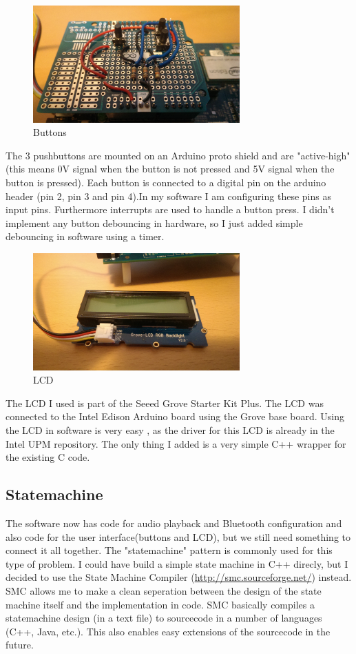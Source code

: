\documentclass[12pt,a4paper]{scrreprt}
\begin{document}
\begin{figure}[h]
	\includegraphics[width=300px]{images/buttons1}
	\caption{Buttons}
\end{figure}

The 3 pushbuttons are mounted on an Arduino proto shield and are "active-high" (this means 0V signal when the button is not pressed and 5V signal when the button is pressed).
Each button is connected to a digital pin on the arduino header (pin 2, pin 3 and pin 4).In my software I am configuring these pins as input pins. Furthermore interrupts are used to handle a button press.
I didn't implement any button debouncing in hardware, so I just added simple debouncing in software using a timer.

\begin{figure}[h]
	\includegraphics[width=300px]{images/LCD}
	\caption{LCD}
\end{figure}

The LCD I used is part of the Seeed Grove Starter Kit Plus. The LCD was connected to the Intel Edison Arduino board using the Grove base board.
Using the LCD in software is very easy , as the driver for this LCD is already in the Intel UPM repository.
The only thing I added is a very simple C++ wrapper for the existing C code.

\subsection{Statemachine}
The software now has code for audio playback and Bluetooth configuration and also code for the user interface(buttons and LCD), but we still need something to connect it all together.
The "statemachine" pattern is commonly used for this type of problem. I could have build a simple state machine in C++ direcly, but I decided to use the State Machine Compiler (\url{http://smc.sourceforge.net/}) instead. SMC allows me to make a clean seperation between the design of the state machine itself and the implementation in code. 
SMC basically compiles a statemachine design (in a  text file) to sourcecode in a number of languages (C++, Java, etc.). 
This also enables easy extensions of the sourcecode in the future.
\end{document}

